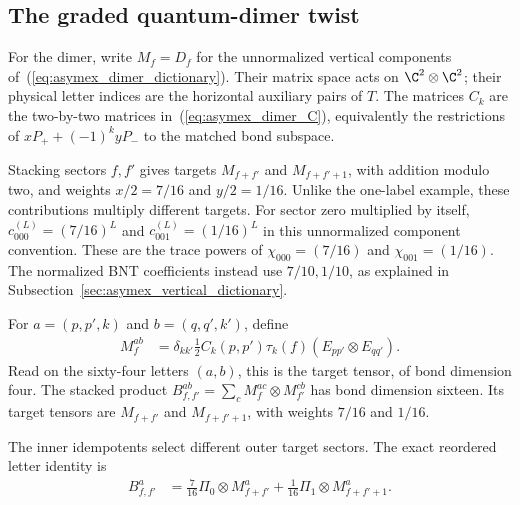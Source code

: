 \subsection{The graded quantum-dimer twist}%
\label{sec:asymex_dimer}

For the dimer, write $M_f=D_f$ for the unnormalized vertical
components of~(\ref{eq:asymex_dimer_dictionary}).
Their matrix space acts on $\C^2\otimes\C^2$; their physical letter
indices are the horizontal auxiliary pairs of $T$. The matrices $C_k$
are the two-by-two matrices in~(\ref{eq:asymex_dimer_C}), equivalently
the restrictions of $xP_++(-1)^kyP_-$ to the matched bond subspace.

Stacking sectors $f,f'$ gives targets $M_{f+f'}$ and $M_{f+f'+1}$,
with addition modulo two, and weights $x/2=7/16$ and $y/2=1/16$.
Unlike the one-label example, these contributions multiply different
targets. For sector zero multiplied by itself,
$c_{000}^{(L)}=(7/16)^L$ and $c_{001}^{(L)}=(1/16)^L$ in this
unnormalized component convention. These are the trace powers of
$\chi_{000}=(7/16)$ and $\chi_{001}=(1/16)$.
The normalized BNT coefficients instead use $7/10,1/10$, as explained
in Subsection~\ref{sec:asymex_vertical_dictionary}.

\begin{definition}
    \label{def:asymex_dimer}
    \leanok
    For $a=(p,p',k)$ and $b=(q,q',k')$, define
    \begin{align}
        M_f^{ab} & =\delta_{kk'} \frac12C_k(p,p')\tau_k(f)
        (E_{pp'}\otimes E_{qq'}).
        \label{eq:asymex_dimer_letters}
    \end{align}
    Read on the sixty-four letters $(a,b)$, this is the target tensor, of bond
    dimension four. The stacked product
    $B_{f,f'}^{ab}=\sum_cM_f^{ac}\otimes M_{f'}^{cb}$ has bond
    dimension sixteen. Its target tensors are $M_{f+f'}$ and
    $M_{f+f'+1}$, with weights $7/16$ and $1/16$.
\end{definition}

The inner idempotents select different outer target sectors.
The exact reordered letter identity is
\begin{align}
    B_{f,f'}^a
     & =\frac7{16}\Pi_0\otimes M_{f+f'}^a
    +\frac1{16}\Pi_1\otimes M_{f+f'+1}^a.
    \label{eq:asymex_dimer_split}
\end{align}

